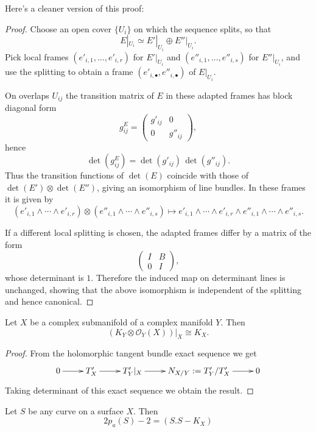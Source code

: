 \noindent
Here's a cleaner version of this proof:

\begin{proof}
Choose an open cover $\{U_i\}$ on which the sequence splits, so that
\[
E|_{U_i}\simeq E'|_{U_i}\oplus E''|_{U_i}.
\]
Pick local frames $(e'_{i,1},\dots,e'_{i,r})$ for $E'|_{U_i}$ and
$(e''_{i,1},\dots,e''_{i,s})$ for $E''|_{U_i}$, and use the splitting to obtain
a frame $(e'_{i,\bullet},e''_{i,\bullet})$ of $E|_{U_i}$.

On overlaps $U_{ij}$ the transition matrix of $E$ in these adapted frames has
block diagonal form
\[
g^E_{ij}=
\begin{pmatrix}
g'_{ij} & 0\\
0 & g''_{ij}
\end{pmatrix},
\]
hence
\[
\det(g^E_{ij})=\det(g'_{ij})\,\det(g''_{ij}).
\]
Thus the transition functions of $\det(E)$ coincide with those of
$\det(E')\otimes\det(E'')$, giving an isomorphism of line bundles. In these
frames it is given by
\[
(e'_{i,1}\wedge\cdots\wedge e'_{i,r})\otimes
(e''_{i,1}\wedge\cdots\wedge e''_{i,s})
\longmapsto
e'_{i,1}\wedge\cdots\wedge e'_{i,r}\wedge
e''_{i,1}\wedge\cdots\wedge e''_{i,s}.
\]

If a different local splitting is chosen, the adapted frames differ by a
matrix of the form
\[
\begin{pmatrix}
I & B\\
0 & I
\end{pmatrix},
\]
whose determinant is $1$. Therefore the induced map on determinant lines is
unchanged, showing that the above isomorphism is independent of the splitting
and hence canonical.
\end{proof}

\begin{theorem}
\label{theorem-adjunction-ii}
Let $X$ be a complex submanifold of a complex manifold $Y$.
Then
\begin{equation}
\label{equation-adjunction-ii}
(K_Y\otimes \mathcal{O}_Y(X))|_{X}\cong K_X.
\end{equation}
\end{theorem}

\begin{proof}
From the holomorphic tangent bundle exact sequence we get
$$
\xymatrix{
0\ar[r]
&T'_X\ar[r]
&T'_Y|_{X}\ar[r]
&N_{X/Y}:=T'_Y/T'_X\ar[r]
&0
}
$$
Taking determinant of this exact sequence we obtain the result.
\end{proof}

\begin{lemma}
\label{lemma-adjunction-formula-for-curves-on-surfaces}
Let $S$ be any curve on a surface $X$. Then
\begin{equation}
\label{equation-adjunction-formula-for-curves-on-surfaces}
2p_a(S)-2=(S.S-K_X)
\end{equation}
\end{lemma}


